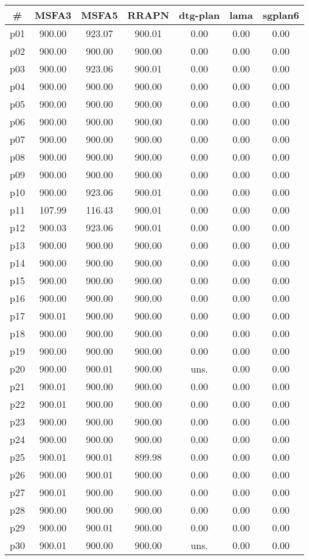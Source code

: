\begin{tabular}{c||c|c|c|c|c|c}
\textbf{\#} & \textbf{MSFA3} & \textbf{MSFA5} & \textbf{RRAPN} & \textbf{dtg-plan} & \textbf{lama} & \textbf{sgplan6}\\
\hline
\hline
p01 & 900.00 & 923.07 & 900.01 & 0.00 & 0.00 & 0.00\\
p02 & 900.00 & 900.00 & 900.00 & 0.00 & 0.00 & 0.00\\
p03 & 900.00 & 923.06 & 900.01 & 0.00 & 0.00 & 0.00\\
p04 & 900.00 & 900.00 & 900.00 & 0.00 & 0.00 & 0.00\\
p05 & 900.00 & 900.00 & 900.00 & 0.00 & 0.00 & 0.00\\
p06 & 900.00 & 900.00 & 900.00 & 0.00 & 0.00 & 0.00\\
p07 & 900.00 & 900.00 & 900.00 & 0.00 & 0.00 & 0.00\\
p08 & 900.00 & 900.00 & 900.00 & 0.00 & 0.00 & 0.00\\
p09 & 900.00 & 900.00 & 900.00 & 0.00 & 0.00 & 0.00\\
p10 & 900.00 & 923.06 & 900.01 & 0.00 & 0.00 & 0.00\\
p11 & 107.99 & 116.43 & 900.01 & 0.00 & 0.00 & 0.00\\
p12 & 900.03 & 923.06 & 900.01 & 0.00 & 0.00 & 0.00\\
p13 & 900.00 & 900.00 & 900.00 & 0.00 & 0.00 & 0.00\\
p14 & 900.00 & 900.00 & 900.00 & 0.00 & 0.00 & 0.00\\
p15 & 900.00 & 900.00 & 900.00 & 0.00 & 0.00 & 0.00\\
p16 & 900.00 & 900.00 & 900.00 & 0.00 & 0.00 & 0.00\\
p17 & 900.01 & 900.00 & 900.00 & 0.00 & 0.00 & 0.00\\
p18 & 900.00 & 900.00 & 900.00 & 0.00 & 0.00 & 0.00\\
p19 & 900.00 & 900.00 & 900.00 & 0.00 & 0.00 & 0.00\\
p20 & 900.00 & 900.01 & 900.00 & uns. & 0.00 & 0.00\\
p21 & 900.01 & 900.00 & 900.00 & 0.00 & 0.00 & 0.00\\
p22 & 900.01 & 900.00 & 900.00 & 0.00 & 0.00 & 0.00\\
p23 & 900.00 & 900.00 & 900.00 & 0.00 & 0.00 & 0.00\\
p24 & 900.00 & 900.00 & 900.00 & 0.00 & 0.00 & 0.00\\
p25 & 900.01 & 900.01 & 899.98 & 0.00 & 0.00 & 0.00\\
p26 & 900.00 & 900.01 & 900.00 & 0.00 & 0.00 & 0.00\\
p27 & 900.01 & 900.00 & 900.00 & 0.00 & 0.00 & 0.00\\
p28 & 900.00 & 900.00 & 900.00 & 0.00 & 0.00 & 0.00\\
p29 & 900.00 & 900.01 & 900.00 & 0.00 & 0.00 & 0.00\\
p30 & 900.01 & 900.00 & 900.00 & uns. & 0.00 & 0.00\\
\end{tabular}

